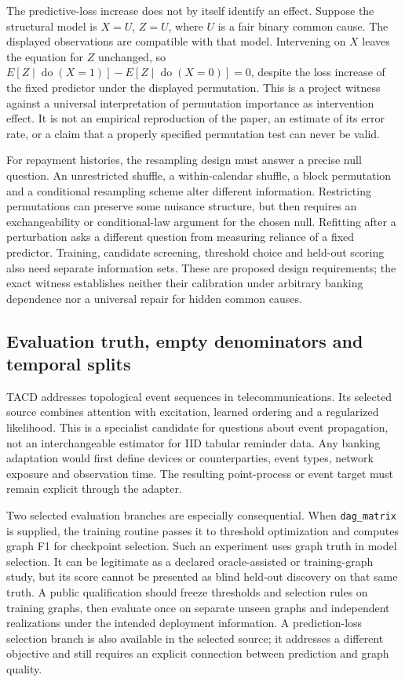 The predictive-loss increase does not by itself identify an effect. Suppose the structural model
is $X=U$, $Z=U$, where $U$ is a fair binary common cause. The displayed observations are compatible
with that model. Intervening on $X$ leaves the equation for $Z$ unchanged, so
$E[Z\mid\operatorname{do}(X=1)]-E[Z\mid\operatorname{do}(X=0)]=0$, despite the loss increase of
the fixed predictor under the displayed permutation. This is a project witness against a
universal interpretation of permutation importance as intervention effect. It is not an
empirical reproduction of the paper, an estimate of its error rate, or a claim that a properly
specified permutation test can never be valid.~\citep{exec28_at_reference}

For repayment histories, the resampling design must answer a precise null question. An unrestricted
shuffle, a within-calendar shuffle, a block permutation and a conditional resampling scheme alter
different information. Restricting permutations can preserve some nuisance structure, but then
requires an exchangeability or conditional-law argument for the chosen null. Refitting after a
perturbation asks a different question from measuring reliance of a fixed predictor. Training,
candidate screening, threshold choice and held-out scoring also need separate information sets.
These are proposed design requirements; the exact witness establishes neither their calibration
under arbitrary banking dependence nor a universal repair for hidden common causes.

\subsection{Evaluation truth, empty denominators and temporal splits}
TACD addresses topological event sequences in telecommunications. Its selected source combines
attention with excitation, learned ordering and a regularized likelihood. This is a specialist
candidate for questions about event propagation, not an interchangeable estimator for IID tabular
reminder data. Any banking adaptation would first define devices or counterparties, event types,
network exposure and observation time. The resulting point-process or event target must remain
explicit through the adapter.~\citep{exec28_at_tacd}

Two selected evaluation branches are especially consequential. When \texttt{dag\_matrix} is supplied,
the training routine passes it to threshold optimization and computes graph F1 for checkpoint
selection. Such an experiment uses graph truth in model selection. It can be legitimate as a
declared oracle-assisted or training-graph study, but its score cannot be presented as blind
held-out discovery on that same truth. A public qualification should freeze thresholds and
selection rules on training graphs, then evaluate once on separate unseen graphs and independent
realizations under the intended deployment information. A prediction-loss selection branch is
also available in the selected source; it addresses a different objective and still requires
an explicit connection between prediction and graph quality.~\citep{exec28_at_tacd}

